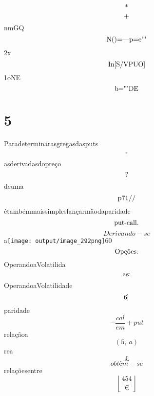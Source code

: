 \documentclass{article}
\begin{document}
\begin{equation}
$*$
\end{equation}\begin{equation}
$+$
\end{equation}nmGQ\begin{equation}
$N()=—p=e""$
\end{equation}2x\begin{equation}
$In[S/VPUO]$
\end{equation}1oNE\begin{equation}
$b=""DE$
\end{equation}\section{5}Paradeterminarasgregasdasputs\begin{equation}
$-$
\end{equation}asderivadasdopreço\begin{equation}
$?$
\end{equation}deuma\begin{equation}
$p71//$
\end{equation}étambémmaissimpleslançarmãodaparidade\begin{equation}
$put-call.$
\end{equation}\begin{equation}
Derivando - se
\end{equation}a\texttt{[image: output/image\_292png]}60\begin{equation}
$Opções:$
\end{equation}OperandoaVolatilida\begin{equation}
$as:$
\end{equation}OperandoaVolatilidade\begin{equation}
$6]$
\end{equation}paridade\begin{equation}
- \frac{cal}{em} + put
\end{equation}relaçãoa\begin{equation}
\left( 5, \  a\right)
\end{equation}rea\begin{equation}
£
\end{equation}\begin{equation}
obtêm - se
\end{equation}relaçõesentre\begin{equation}
\left\lfloor{\frac{454}{€}}\right\rfloor
\end{equation}\begin{equation}

\end{equation}
\end{document}
